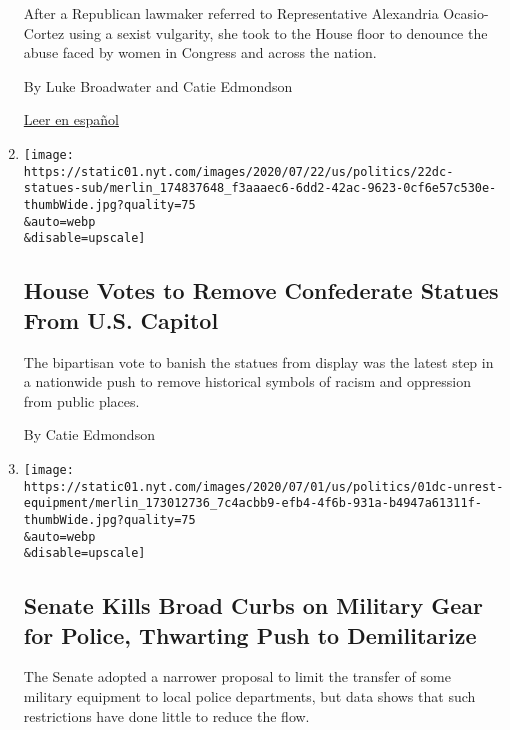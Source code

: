 \begin{enumerate}
  After a Republican lawmaker referred to Representative Alexandria
  Ocasio-Cortez using a sexist vulgarity, she took to the House floor to
  denounce the abuse faced by women in Congress and across the nation.

  By Luke Broadwater and Catie Edmondson

  \href{https://www.nytimes.com/es/2020/07/24/espanol/estados-unidos/alexandria-ocasio-cortez-insulto.html}{Leer
  en español}
\item
  \href{/2020/07/22/us/politics/confederate-statues-us-capitol.html}{}

  \texttt{[image: https://static01.nyt.com/images/2020/07/22/us/politics/22dc-statues-sub/merlin\_174837648\_f3aaaec6-6dd2-42ac-9623-0cf6e57c530e-thumbWide.jpg?quality=75\\\&auto=webp\\\&disable=upscale]}

  \hypertarget{house-votes-to-remove-confederate-statues-from-us-capitol}{%
  \subsection{House Votes to Remove Confederate Statues From U.S.
  Capitol}\label{house-votes-to-remove-confederate-statues-from-us-capitol}}

  The bipartisan vote to banish the statues from display was the latest
  step in a nationwide push to remove historical symbols of racism and
  oppression from public places.

  By Catie Edmondson
\item
  \href{/2020/07/21/us/politics/senate-police-military-equipment.html}{}

  \texttt{[image: https://static01.nyt.com/images/2020/07/01/us/politics/01dc-unrest-equipment/merlin\_173012736\_7c4acbb9-efb4-4f6b-931a-b4947a61311f-thumbWide.jpg?quality=75\\\&auto=webp\\\&disable=upscale]}

  \hypertarget{senate-kills-broad-curbs-on-military-gear-for-police-thwarting-push-to-demilitarize}{%
  \subsection{Senate Kills Broad Curbs on Military Gear for Police,
  Thwarting Push to
  Demilitarize}\label{senate-kills-broad-curbs-on-military-gear-for-police-thwarting-push-to-demilitarize}}

  The Senate adopted a narrower proposal to limit the transfer of some
  military equipment to local police departments, but data shows that
  such restrictions have done little to reduce the flow.


\end{enumerate}
